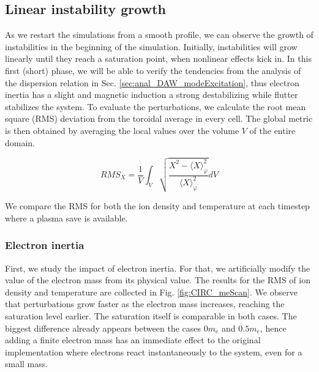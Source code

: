 \subsection{Linear instability growth}

As we restart the simulations from a smooth profile, we can observe the growth of instabilities in the beginning of the simulation. Initially, instabilities will grow linearly until they reach a saturation point, when nonlinear effects kick in. In this first (short) phase, we will be able to verify the tendencies from the analysis of the dispersion relation in Sec. \ref{sec:anal_DAW_modeExcitation}, thus electron inertia has a slight and magnetic induction a strong destabilizing while flutter stabilizes the system. To evaluate the perturbations, we calculate the root mean square (RMS) deviation from the toroidal average in every cell. The global metric is then obtained by averaging the local values over the volume $V$ of the entire domain. 

\begin{equation}
	RMS_X = \frac{1}{V}\int_V \sqrt{\frac{X^2 - \langle X \rangle_\varphi^2}{\langle X \rangle_\varphi^2}}  dV
\end{equation}
	
We compare the RMS for both the ion density and temperature at each timestep where a plasma save is available. 

\subsubsection{Electron inertia}

First, we study the impact of electron inertia. For that, we artificially modify the value of the electron mass from its physical value. The results for the RMS of ion density and temperature are collected in Fig. \ref{fig:CIRC_meScan}. We observe that perturbations grow faster as the electron mass increases, reaching the saturation level earlier. The saturation itself is comparable in both cases. The biggest difference already appears between the cases $0m_e$ and $0.5m_e$, hence adding a finite electron mass has an immediate effect to the original implementation where electrons react instantaneously to the system, even for a small mass. 
 
